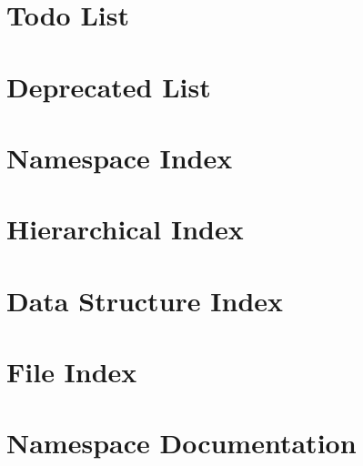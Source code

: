 \documentclass[twoside]{book}
\newcommand{\+}{\discretionary{\mbox{\scriptsize$\hookleftarrow$}}{}{}}
\begin{document}
\chapter{Todo List}
\label{todo}
\hypertarget{todo}{}

\chapter{Deprecated List}
\label{deprecated}
\hypertarget{deprecated}{}

\chapter{Namespace Index}

\chapter{Hierarchical Index}

\chapter{Data Structure Index}

\chapter{File Index}

\chapter{Namespace Documentation}













\end{document}
